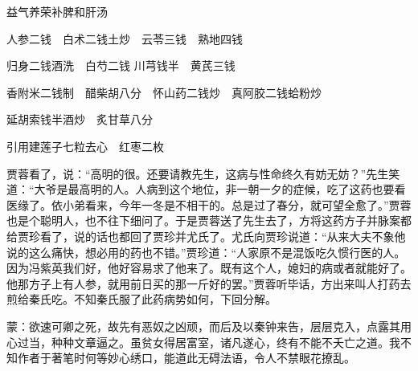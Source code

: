 \begin{qute}
    \begin{parag}
        益气养荣补脾和肝汤
    \end{parag}

    \begin{parag}
        人参二钱　白术二钱土炒　云苓三钱　熟地四钱
    \end{parag}

    \begin{parag}
        归身二钱酒洗　白芍二钱 川芎钱半　黄芪三钱
    \end{parag}

    \begin{parag}
        香附米二钱制　醋柴胡八分　怀山药二钱炒　真阿胶二钱蛤粉炒
    \end{parag}

    \begin{parag}
        延胡索钱半酒炒　炙甘草八分
    \end{parag}

    \begin{parag}
        引用建莲子七粒去心　红枣二枚
    \end{parag}
\end{qute}

\begin{parag}
    贾蓉看了，说：“高明的很。还要请教先生，这病与性命终久有妨无妨？”先生笑道：“大爷是最高明的人。人病到这个地位，非一朝一夕的症候，吃了这药也要看医缘了。依小弟看来，今年一冬是不相干的。总是过了春分，就可望全愈了。”贾蓉也是个聪明人，也不往下细问了。于是贾蓉送了先生去了，方将这药方子并脉案都给贾珍看了，说的话也都回了贾珍并尤氏了。尤氏向贾珍说道：“从来大夫不象他说的这么痛快，想必用的药也不错。”贾珍道：“人家原不是混饭吃久惯行医的人。因为冯紫英我们好，他好容易求了他来了。既有这个人，媳妇的病或者就能好了。他那方子上有人参，就用前日买的那一斤好的罢。”贾蓉听毕话，方出来叫人打药去煎给秦氏吃。不知秦氏服了此药病势如何，下回分解。
\end{parag}


\begin{parag}
    \begin{note}蒙：欲速可卿之死，故先有恶奴之凶顽，而后及以秦钟来告，层层克入，点露其用心过当，种种文章逼之。虽贫女得居富室，诸凡遂心，终有不能不夭亡之道。我不知作者于著笔时何等妙心绣口，能道此无碍法语，令人不禁眼花撩乱。\end{note}
\end{parag}
